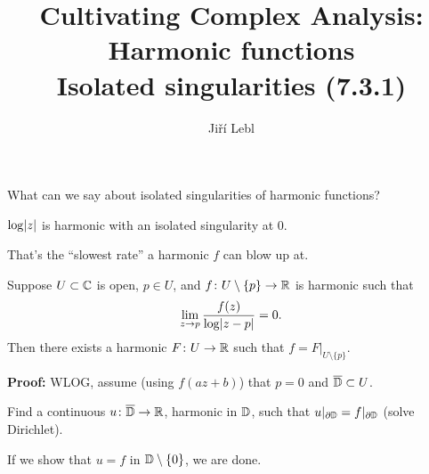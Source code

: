 \documentclass[10pt,aspectratio=169]{beamer}
\author{Ji\v{r}\'i Lebl}
\institute[OSU]{%
Departemento pri Matematiko de Oklahoma {\^S}tata Universitato}
\title{Cultivating Complex Analysis:\\%
Harmonic functions\\%
Isolated singularities (7.3.1)}
\date{}
\begin{document}
\begin{frame}
\titlepage
\end{frame}

\begin{frame}
What can we say about isolated singularities of harmonic functions?

\medskip
\pause

$\log \lvert {z} \rvert$ is harmonic with an isolated singularity at $0$.

\medskip
\pause

That's the ``slowest rate'' a harmonic $f$ can blow up at.

\begin{theorem}
Suppose $U \subset {\mathbb{C}}$ is open, $p \in U$, and $f \colon U \setminus \{ p \}
\to {\mathbb{R}}$ is harmonic such that
\begin{equation*}
\lim_{z\to p} \frac{f(z)}{\log \lvert {z-p} \rvert} = 0 .
\end{equation*}
Then there exists a harmonic $F \colon U \to {\mathbb{R}}$ such that
$f = F|_{U \setminus \{ p \}}$.
\end{theorem}

\medskip
\pause

\textbf{Proof:}
WLOG, assume (using $f(a z + b)$) that $p = 0$ and $\overline{{\mathbb{D}}} \subset U$.

\medskip
\pause

Find a continuous $u \colon \overline{{\mathbb{D}}} \to {\mathbb{R}}$,
harmonic in ${\mathbb{D}}$, such that $u|_{\partial {\mathbb{D}}} = f|_{\partial {\mathbb{D}}}$
(solve Dirichlet).

\medskip
\pause

If we show that $u = f$ in ${\mathbb{D}} \setminus \{ 0 \}$, we are done.

\end{frame}
\end{document}
